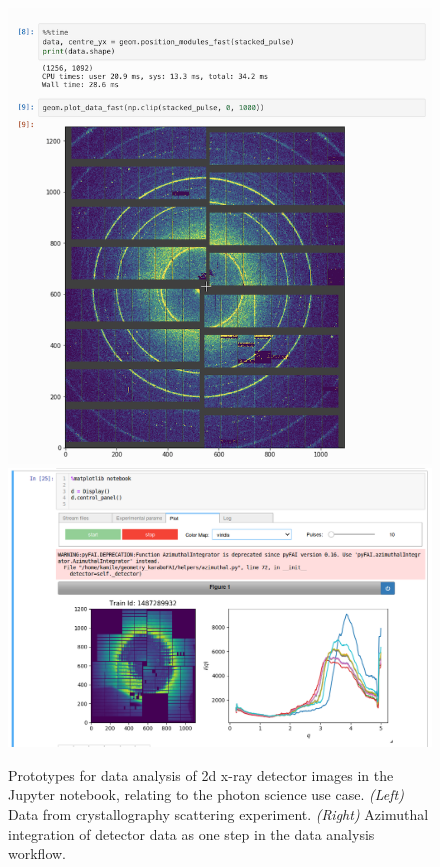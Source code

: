   \medskip

\begin{figure}[tb]
    \centering
    \includegraphics[height=0.27\textheight]{images/photon-science-prototype1.png}
    \includegraphics[height=0.27\textheight]{images/photon-science-prototype2.png}
    \caption{Prototypes for data analysis of 2d x-ray detector images
      in the Jupyter notebook, relating to the
      photon science use case.
      \emph{(Left)} Data from crystallography
      scattering experiment. \emph{(Right)} Azimuthal integration of detector
      data as one step in the data analysis workflow.}
    \label{fig:photon-science-example}
  \end{figure}


